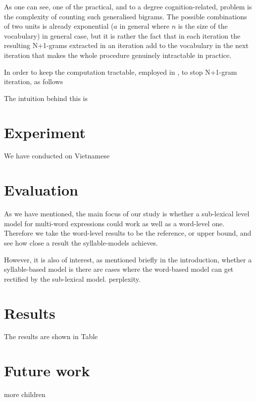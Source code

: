 \documentclass{article}
\begin{document}
As one can see, one of the practical, and to a degree cognition-related, problem is the complexity of counting such generalised bigrams. The possible combinations of two units is already exponential ($a$ in general where $n$ is the size of the vocabulary) in general case, but it is rather the fact that in each iteration the resulting N+1-grams extracted in an iteration add to the vocabulary in the next iteration that makes the whole procedure genuinely intractable in practice. 

In order to keep the computation tractable,  employed in \cite{} , to stop  N+1-gram iteration, as follows

The intuition behind this is 

 





\section{Experiment}

We have conducted on Vietnamese



\section{Evaluation}

As we have mentioned, the main focus of our study is whether a sub-lexical level model for multi-word expressions could work as well as a word-level one. Therefore we take the word-level results to be the reference, or upper bound, and see how close a result the syllable-models achieves.

However, it is also of interest, as mentioned briefly in the introduction, whether a syllable-based model is there are cases where the word-based model can get rectified by the sub-lexical model. perplexity.

\section{Results}

The results are shown in Table 


\section{Future work}

more children



\end{document}

